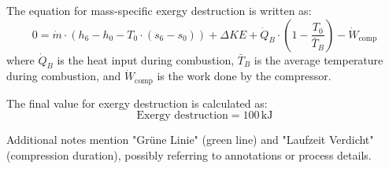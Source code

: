 The equation for mass-specific exergy destruction is written as:  
\[
0 = \dot{m} \cdot (h_6 - h_0 - T_0 \cdot (s_6 - s_0)) + \Delta KE + \dot{Q}_B \cdot \left(1 - \frac{T_0}{\bar{T}_B}\right) - \dot{W}_{\text{comp}}
\]  
where \(\dot{Q}_B\) is the heat input during combustion, \(\bar{T}_B\) is the average temperature during combustion, and \(\dot{W}_{\text{comp}}\) is the work done by the compressor.

The final value for exergy destruction is calculated as:  
\[
\text{Exergy destruction} = 100 \, \text{kJ}
\]  

Additional notes mention "Grüne Linie" (green line) and "Laufzeit Verdicht" (compression duration), possibly referring to annotations or process details.